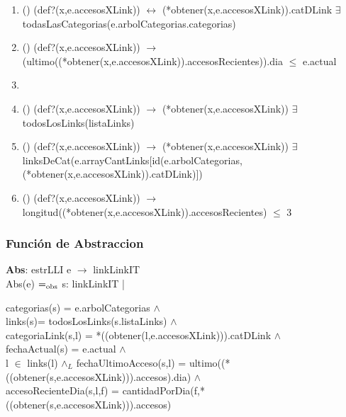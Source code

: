 \documentclass[10pt, a4paper]{article}
\begin{document}
	   \begin{enumerate}

	   \item () (def?(x,e.accesosXLink)) $\leftrightarrow$ (*obtener(x,e.accesosXLink)).catDLink $\exists$ todasLasCategorias(e.arbolCategorias.categorias)

	   \item () (def?(x,e.accesosXLink)) $\rightarrow$ (ultimo((*obtener(x,e.accesosXLink)).accesosRecientes)).dia $\leq$ e.actual

	   \item 

	   \item () (def?(x,e.accesosXLink)) $\rightarrow$ (*obtener(x,e.accesosXLink)) $\exists$ todosLosLinks(listaLinks)

	   \item () (def?(x,e.accesosXLink)) $\rightarrow$ (*obtener(x,e.accesosXLink)) $\exists$ linksDeCat(e.arrayCantLinks[id(e.arbolCategorias,(*obtener(x,e.accesosXLink)).catDLink)])
 
	   \item () (def?(x,e.accesosXLink)) $\rightarrow$ longitud((*obtener(x,e.accesosXLink)).accesosRecientes) $\leq$ 3

\end{enumerate}

\subsubsection{\Large Funci\'{o}n de Abstraccion}

	    \textbf{Abs}: estrLLI e $\rightarrow$ linkLinkIT \\
   	    Abs(e) $=_{\mathrm{obs}}$ s: linkLinkIT | \\
   	   \begin{flushright}
 categorias(s) = e.arbolCategorias $\wedge$ \\
 links(s)= todosLosLinks(s.listaLinks) $\wedge$ \\
 categoriaLink(s,l) = *((obtener(l,e.accesosXLink))).catDLink $\wedge$ \\
fechaActual(s) = e.actual $\wedge$ \\
 l $\in$ links(l) $\wedge{_L}$ fechaUltimoAcceso(s,l) = ultimo((*((obtener(s,e.accesosXLink))).accesos).dia) $\wedge$ \\
 accesoRecienteDia(s,l,f) = cantidadPorDia(f,*((obtener(s,e.accesosXLink))).accesos)
\end{flushright}
	
\end{document}
